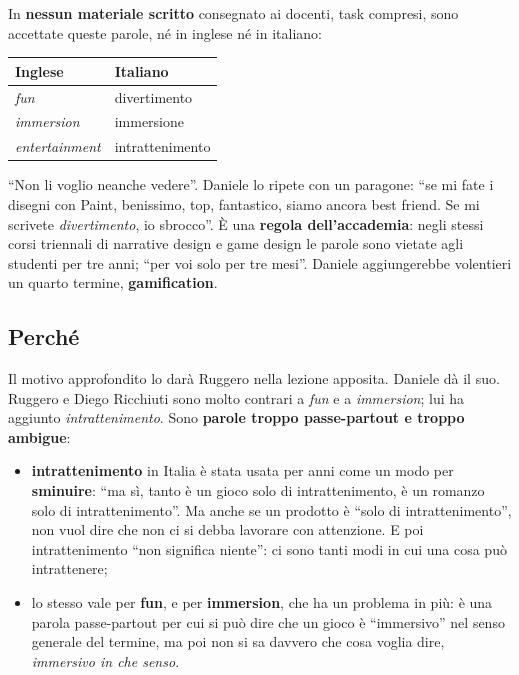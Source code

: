 In \textbf{nessun materiale scritto} consegnato ai docenti, task compresi, sono
accettate queste parole, né in inglese né in italiano:
\begin{center}
\begin{tabular}{@{}ll@{}}
\toprule
\textbf{Inglese} & \textbf{Italiano} \\
\midrule
\emph{fun} & divertimento \\
\emph{immersion} & immersione \\
\emph{entertainment} & intrattenimento \\
\bottomrule
\end{tabular}
\end{center}
``Non li voglio neanche vedere''. Daniele lo ripete con un paragone: ``se mi fate
i disegni con Paint, benissimo, top, fantastico, siamo ancora best friend. Se mi
scrivete \emph{divertimento}, io sbrocco''. È una \textbf{regola dell'accademia}:
negli stessi corsi triennali di narrative design e game design le parole sono
vietate agli studenti per tre anni; ``per voi solo per tre mesi''. Daniele
aggiungerebbe volentieri un quarto termine, \textbf{gamification}.

\subsection{Perché}

Il motivo approfondito lo darà Ruggero nella lezione apposita. Daniele dà il
suo. Ruggero e Diego Ricchiuti sono molto contrari a \emph{fun} e a
\emph{immersion}; lui ha aggiunto \emph{intrattenimento}. Sono \textbf{parole
troppo passe-partout e troppo ambigue}:
\begin{itemize}
  \item \textbf{intrattenimento} in Italia è stata usata per anni come un modo
        per \textbf{sminuire}: ``ma sì, tanto è un gioco solo di
        intrattenimento, è un romanzo solo di intrattenimento''. Ma anche se un
        prodotto è ``solo di intrattenimento'', non vuol dire che non ci si debba
        lavorare con attenzione. E poi intrattenimento ``non significa niente'':
        ci sono tanti modi in cui una cosa può intrattenere;
  \item lo stesso vale per \textbf{fun}, e per \textbf{immersion}, che ha un
        problema in più: è una parola passe-partout per cui si può dire che un
        gioco è ``immersivo'' nel senso generale del termine, ma poi non si sa
        davvero che cosa voglia dire, \emph{immersivo in che senso}.
\end{itemize}

